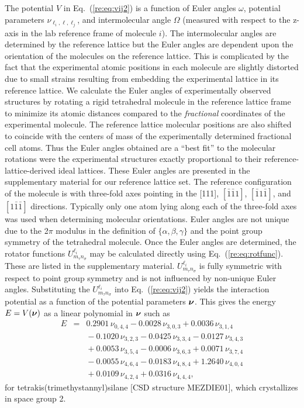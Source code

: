 \documentclass[preprint]{revtex4}
\newcommand{\mb}[1]{\ensuremath{\mbox{\boldmath $ #1 $}}}
\begin{document}
The potential $V$ in Eq.\ (\ref{re:eq:vij2}) is a function of Euler
angles $\omega$, potential parameters $\nu_{\ell_i,\ell,\ell_j}$,
and intermolecular angle $\Omega$ (measured with respect to the
z-axis in the lab reference frame of molecule $i$). The
intermolecular angles are determined by the reference lattice but
the Euler angles are dependent upon the orientation of the molecules
on the reference lattice. This is complicated by the fact that the
experimental atomic positions in each molecule are slightly
distorted due to small strains resulting from embedding the
experimental lattice in its reference lattice. We calculate the
Euler angles of experimentally observed structures by rotating a
rigid tetrahedral molecule in the reference lattice frame to
minimize its atomic distances compared to the \emph{fractional}
coordinates of the experimental molecule. The reference lattice
molecular positions are also shifted to coincide with the centers of
mass of the experimentally determined fractional cell atoms. Thus
the Euler angles obtained are a ``best fit'' to the molecular
rotations were the experimental structures exactly proportional to
their reference-lattice-derived ideal lattices. These Euler angles
are presented in the supplementary material for our reference
lattice set. The reference configuration of the molecule is with
three-fold axes pointing in the [111], $[\bar{1}\bar{1}1]$,
$[\bar{1}1\bar{1}]$, and $[1\bar{1}\bar{1}]$ directions. Typically
only one atom lying along each of the three-fold axes was used when
determining molecular orientations. Euler angles are not unique due
to the 2$\pi$ modulus in the definition of $\{\alpha,\beta,\gamma\}$
and the point group symmetry of the tetrahedral molecule. Once the
Euler angles are determined, the rotator functions
$U^{\ell_i}_{m_\tau n_\sigma}$ may be calculated directly using
Eq.~(\ref{re:eq:rotfunc}). These are listed in the supplementary
material. $U^{\ell_i}_{m_\tau n_\sigma}$ is fully symmetric with
respect to point group symmetry and is not influenced by non-unique
Euler angles. Substituting the $U^{\ell_i}_{m_\tau n_\sigma}$ into
Eq.~(\ref{re:eq:vij2}) yields the interaction potential as a function
of the potential parameters $\mb{\nu}$. This gives the energy
$E=V(\mb{\nu})$ as a linear polynomial in $\mb{\nu}$ such as
\begin{eqnarray}
\label{energyOfStructure} E & = & 0.2901\,\nu_{0,4,4} -
0.0028\,\nu_{3,0,3} +
0.0036\,\nu_{3,1,4}  \nonumber \\
&&{}- 0.1020\,\nu_{3,2,3} - 0.0425\,\nu_{3,3,4} -0.0127\,\nu_{3,4,3}
 \nonumber \\
&&{}+ 0.0053\,\nu_{3,5,4} - 0.0006\,\nu_{3,6,3} +
0.0071\,\nu_{3,7,4}  \nonumber \\
&&{}- 0.0055\,\nu_{4,6,4} - 0.0183\,\nu_{4,8,4}+
1.2640\,\nu_{4,0,4}\nonumber\\
&&{}+ 0.0109\,\nu_{4,2,4} + 0.0316\,\nu_{4,4,4},
\end{eqnarray}
for tetrakis(trimethystannyl)silane  [CSD structure MEZDIE01], which
crystallizes in space group 2.
\end{document}
